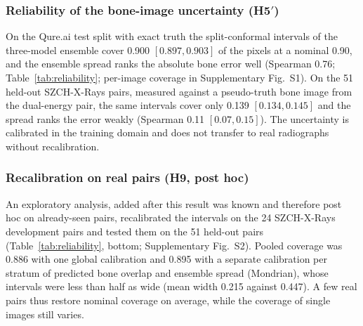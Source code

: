 \subsubsection{Reliability of the bone-image uncertainty (H5$'$)}
On the Qure.ai test split with exact truth the split-conformal intervals of the three-model ensemble cover 0.900 $[0.897,0.903]$ of the
pixels at a nominal 0.90, and the ensemble spread ranks the absolute bone error well (Spearman 0.76; Table~\ref{tab:reliability};
per-image coverage in Supplementary Fig.~S1). On the 51 held-out SZCH-X-Rays pairs, measured against a pseudo-truth bone image from the dual-energy pair,
the same intervals cover only 0.139 $[0.134,0.145]$ and the spread ranks the error weakly (Spearman 0.11 $[0.07,0.15]$). The uncertainty is
calibrated in the training domain and does not transfer to real radiographs without recalibration.

\begin{table}[!t]
\centering
\caption{Bone-image uncertainty. Top (H5$'$): ensemble spread and split-conformal intervals ($K=3$, nominal coverage 0.90), with
image-bootstrap intervals. Bottom (H9, exploratory and post hoc): intervals recalibrated on the 24 SZCH-X-Rays development pairs and
tested on the 51 held-out pairs at nominal 0.90; Mondrian: calibration per stratum of predicted bone overlap and ensemble spread.}
\label{tab:reliability}
\end{table}

\subsubsection{Recalibration on real pairs (H9, post hoc)}
An exploratory analysis, added after this result was known and therefore post hoc on already-seen pairs, recalibrated the intervals on the
24 SZCH-X-Rays development pairs and tested them on the 51 held-out pairs (Table~\ref{tab:reliability}, bottom; Supplementary Fig.~S2).
Pooled coverage was 0.886 with one global calibration and 0.895 with a separate calibration per stratum of predicted bone overlap and
ensemble spread (Mondrian), whose intervals were less than half as wide (mean width 0.215 against 0.447). A few real pairs thus restore
nominal coverage on average, while the coverage of single images still varies.

